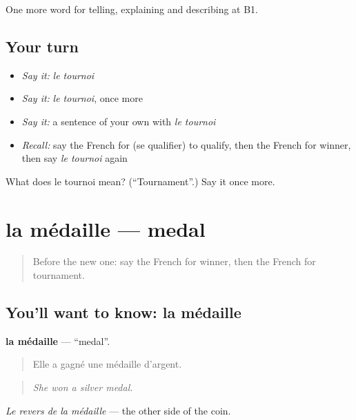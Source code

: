 \begin{grammarlens}[title={What you've built}]
One more word for telling, explaining and describing at B1.
\end{grammarlens}

\subsection*{Your turn}
\begin{itemize}
\raggedright
  \item \emph{Say it:} \emph{le tournoi}
  \item \emph{Say it:} \emph{le tournoi}, once more
  \item \emph{Say it:} a sentence of your own with \emph{le tournoi}
  \item \emph{Recall:} say the French for (se qualifier) to qualify, then the French for winner, then say \emph{le tournoi} again
\end{itemize}

\begin{tcolorbox}[breakable,colback=teal!4,colframe=teal!35!black,title={Before you move on}]
What does le tournoi mean? (\textquotedblleft{}Tournament\textquotedblright{}.) Say it once more.
\end{tcolorbox}
\section[la médaille]{la médaille — medal}

\label{lesson:FR-C507-medaille}



\begin{quote}
Before the new one: say the French for winner, then the French for tournament.
\end{quote}

\subsection*{You'll want to know: la médaille}
\textbf{la médaille} — \textquotedblleft{}medal\textquotedblright{}.

\begin{quote}
Elle a gagné une médaille d'argent.
\end{quote}

\begin{quote}
\emph{She won a silver medal.}
\end{quote}

\emph{Le revers de la médaille} — the other side of the coin.

